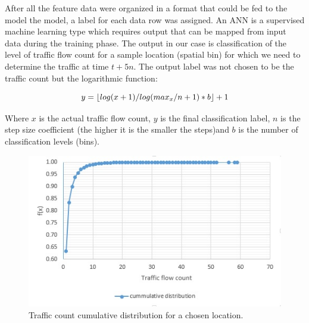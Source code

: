 \documentclass[12pt, a4paper]{report}
\theoremstyle{definition}
\theoremstyle{definition}%
\theoremstyle{definition}%
\theoremstyle{definition}%
\theoremstyle{definition}%
\theoremstyle{definition}%
\begin{document}
\begin{table}[h]	
	\centering
	\caption{Sparse traffic flow matrix} 
	\label{table:dataset_03}
\end{table}

After all the feature data were organized in a format that could be fed to the model the model, a label for each data row was assigned. An ANN is a supervised machine learning type which requires output that can be mapped from input data during the training phase. The output in our case is classification of the level of traffic flow count for a sample location (spatial bin) for which we need to determine the traffic at time $t + 5n$. The output label was not chosen to be the traffic count but the logarithmic function: 

\begin{equation} \label{equation:logarithmic_step_function}
y=\lfloor{log(x+1)/log(max_x/n + 1) * b}\rfloor + 1  \\
\end{equation}

Where $x$ is the actual traffic flow count, $y$ is the final classification label, $n$ is the step size coefficient (the higher it is the smaller the steps)and $b$ is the number of classification levels (bins). 

\begin{figure}[h]	
	\includegraphics[scale=0.75]{traffic_count_cumm_distribution.jpg}
	\centering
	\caption{Traffic count cumulative distribution for a chosen location. }
	\label{fig:traffic_count_distribution_distribution}
\end{figure}
\end{document}
